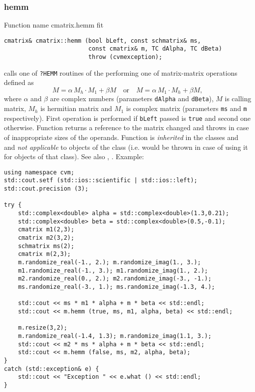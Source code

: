 \subsubsection{hemm}
Function%
\pdfdest name {cmatrix.hemm} fit
\begin{verbatim}
cmatrix& cmatrix::hemm (bool bLeft, const schmatrix& ms,
                        const cmatrix& m, TC dAlpha, TC dBeta)
                        throw (cvmexception);
\end{verbatim}
calls one of \verb"?HEMM" routines of the
performing one of 
matrix-matrix operations defined as
\begin{equation*}
M=\alpha\,M_h\cdot M_1 + \beta M\quad\text{or}\quad M=\alpha\,M_1\cdot M_h + \beta M,
\end{equation*}
where $\alpha$ and $\beta$ are complex numbers
(parameters \verb"dAlpha" and \verb"dBeta"),
$M$ is  calling matrix,
$M_h$ is  hermitian matrix and $M_1$ 
is  complex matrix (parameters \verb"ms"
and \verb"m" respectively). 
First operation is performed if \verb"bLeft" passed
is \verb"true" and second one otherwise.
Function
returns a reference to the matrix changed and throws
in case of inappropriate sizes of the operands.
Function is \emph{inherited} in  the classes
 and
 and
\emph{not applicable} to objects of the class
 (i.e.  would be thrown
in case of using it for objects of that class).
See also ,
.
Example:
\begin{Verbatim}
using namespace cvm;
std::cout.setf (std::ios::scientific | std::ios::left); 
std::cout.precision (3);

try {
    std::complex<double> alpha = std::complex<double>(1.3,0.21);
    std::complex<double> beta = std::complex<double>(0.5,-0.1);
    cmatrix m1(2,3);
    cmatrix m2(3,2);
    schmatrix ms(2);
    cmatrix m(2,3);
    m.randomize_real(-1., 2.); m.randomize_imag(1., 3.); 
    m1.randomize_real(-1., 3.); m1.randomize_imag(1., 2.);
    m2.randomize_real(0., 2.); m2.randomize_imag(-3., -1.);
    ms.randomize_real(-3., 1.); ms.randomize_imag(-1.3, 4.);

    std::cout << ms * m1 * alpha + m * beta << std::endl;
    std::cout << m.hemm (true, ms, m1, alpha, beta) << std::endl;

    m.resize(3,2);
    m.randomize_real(-1.4, 1.3); m.randomize_imag(1.1, 3.); 
    std::cout << m2 * ms * alpha + m * beta << std::endl;
    std::cout << m.hemm (false, ms, m2, alpha, beta);
}
catch (std::exception& e) {
    std::cout << "Exception " << e.what () << std::endl;
}
\end{Verbatim}
